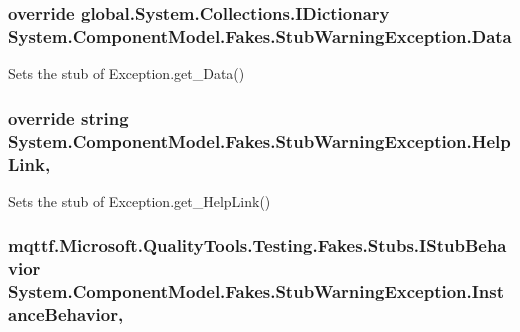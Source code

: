 \hypertarget{class_system_1_1_component_model_1_1_fakes_1_1_stub_warning_exception_ab7888560a53c4c2c9694a2cb9dab93d0}{
\subsubsection[{Data}]{\setlength{\rightskip}{0pt plus 5cm}override global.\-System.\-Collections.\-I\-Dictionary System.\-Component\-Model.\-Fakes.\-Stub\-Warning\-Exception.\-Data\hspace{0.3cm}{\ttfamily [get]}}}\label{class_system_1_1_component_model_1_1_fakes_1_1_stub_warning_exception_ab7888560a53c4c2c9694a2cb9dab93d0}


Sets the stub of Exception.\-get\-\_\-\-Data()

\hypertarget{class_system_1_1_component_model_1_1_fakes_1_1_stub_warning_exception_ae1f39418742490663d5e4f04cef69989}{
\subsubsection[{Help\-Link}]{\setlength{\rightskip}{0pt plus 5cm}override string System.\-Component\-Model.\-Fakes.\-Stub\-Warning\-Exception.\-Help\-Link\hspace{0.3cm}{\ttfamily [get]}, {\ttfamily [set]}}}\label{class_system_1_1_component_model_1_1_fakes_1_1_stub_warning_exception_ae1f39418742490663d5e4f04cef69989}


Sets the stub of Exception.\-get\-\_\-\-Help\-Link()

\hypertarget{class_system_1_1_component_model_1_1_fakes_1_1_stub_warning_exception_a9b7c1a9f905e23f495e99c66f311912a}{
\subsubsection[{Instance\-Behavior}]{\setlength{\rightskip}{0pt plus 5cm}mqttf.\-Microsoft.\-Quality\-Tools.\-Testing.\-Fakes.\-Stubs.\-I\-Stub\-Behavior System.\-Component\-Model.\-Fakes.\-Stub\-Warning\-Exception.\-Instance\-Behavior\hspace{0.3cm}{\ttfamily [get]}, {\ttfamily [set]}}}\label{class_system_1_1_component_model_1_1_fakes_1_1_stub_warning_exception_a9b7c1a9f905e23f495e99c66f311912a}


